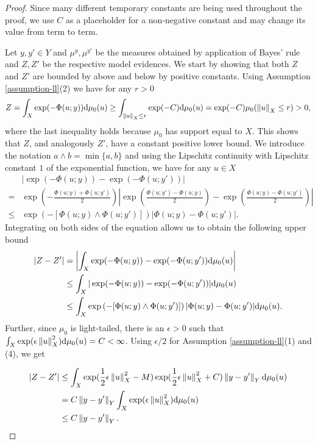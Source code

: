 \begin{proof}
  Since many different temporary constants are being used throughout the proof, we use $C$ as a placeholder for a non-negative constant and may change its value from term to term.

  Let $y, y' \in Y$ and  $\mu^y, \mu^{y'}$ be the measures obtained by application of Bayes' rule and $Z, Z'$ be the respective model evidences. We start by showing that both $Z$ and $Z'$ are bounded by above and below by positive constants. Using Assumption \ref{assumption-ll}(2) we have for any $r > 0$
  \begin{equation*}
    Z = \int_X\exp(-\Phi(u; y))\text{d}\mu_0(u) \ge \int_{\left\lVert u\right\rVert_X \le r}\exp(-C)\text{d}\mu_0(u) = \exp(-C)\mu_0(\left\lVert u\right\rVert_X \le r) > 0,
  \end{equation*}
  where the last inequality holds because $\mu_0$ has support equal to $X$. This shows that $Z$, and analogously $Z'$, have a constant positive lower bound. We introduce the notation $a \land b = \min\{a, b\}$ and using the Lipschitz continuity with Lipschitz constant $1$ of the exponential function, we have for any $u \in X$
  \begin{align*}
    &|\exp(-\Phi(u; y)) - \exp(-\Phi(u; y'))|\\
    =&\exp\left(-\frac{\Phi(u; y) + \Phi(u; y')}{2}\right)\left|\exp\left(\frac{\Phi(u; y')-\Phi(u; y)}2\right) - \exp\left(\frac{\Phi(u; y)-\Phi(u; y')}2\right)\right|\\
    \leq&\exp\left(-[\Phi(u;y) \land \Phi(u; y')]\right)|\Phi(u;y) - \Phi(u; y')|.
  \end{align*}
  Integrating on both sides of the equation allows us to obtain the following upper bound
  \begin{align*}
    |Z - Z'|
    &=\left|\int_X\exp(-\Phi(u; y)) - \exp(-\Phi(u; y'))\text{d}\mu_0(u)\right|\\
    &\leq \int_X|\exp(-\Phi(u; y)) - \exp(-\Phi(u; y'))|\text{d}\mu_0(u)\\
    &\leq \int_X\exp\left(-[\Phi(u;y) \land \Phi(u; y')]\right)|\Phi(u;y) - \Phi(u; y')|\text{d}\mu_0(u).
  \end{align*}
  Further, since $\mu_0$ is light-tailed, there is an $\epsilon > 0$ such that $\int_X\exp(\epsilon \left\lVert u\right\rVert_X^2)\text{d} \mu_0(u) = C < \infty$. Using $\epsilon / 2$ for Assumption \ref{assumption-ll}(1) and (4), we get

  \begin{equation}\label{bound-z}
    \begin{aligned}
      |Z - Z'|
      &\le \int_X \exp(\frac12\epsilon\left\lVert u\right\rVert_X^2 - M)\exp(\frac12\epsilon\left\lVert u\right\rVert_X^2 + C)\left\lVert y - y'\right\rVert_Y \text{d}\mu_0(u) \\
      &= C  \left\lVert y - y'\right\rVert_Y \int_X \exp(\epsilon\left\lVert u\right\rVert_X^2) \text{d}\mu_0(u)\\
      &\le C\left\lVert y - y'\right\rVert_Y.
      \end{aligned}
  \end{equation}


\end{proof}
